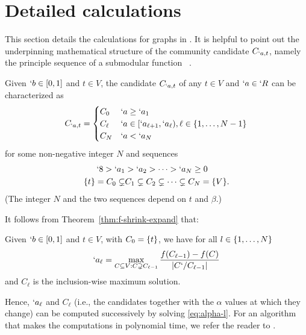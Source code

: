 \section{Detailed calculations}
\label{sec:calculations}
This section details the calculations for graphs in . It is helpful to point out the underpinning mathematical structure of
the community candidate $C_{`a,t}$, namely the principle sequence of a submodular function~\cite{fujishige80} \cite{fujishige-pp-revisited}.

\begin{proposition}
  \label{pro:ps}
  Given $`b\in [0,1]$ and $t\in V$, the candidate $C_{`a,t}$ of any $t\in V$ and $`a\in `R$ can be characterized as
  \begin{align}
    C_{`a,t}  = \begin{cases}
      C_0 & `a\geq `a_1\\
      C_{\ell} & `a\in [`a_{\ell+1},`a_{\ell}), \ell \in \{1,\dots,N-1\}\\
      C_N & `a<`a_N
      \end{cases}
  \end{align}
  for some non-negative integer $N$ and sequences
  \begin{align}
    `8 > `a_1 &> `a_2 > \dots > `a_N \geq 0 \label{eq:`as}\\
    \{t\}=C_0 \subsetneq & C_1  \subsetneq C_2 \subsetneq \dots\subsetneq C_N = \{V\}.\label{eq:Cs}
  \end{align}
  (The integer $N$ and the two sequences depend on $t$ and $\beta$.)
\end{proposition}

It follows from Theorem~\ref{thm:f-shrink-expand} that:
\begin{Corollary}
	\label{cor:alpha-l}
	Given $`b\in [0,1]$ and $t\in V$, with $C_{0} = \{t\}$, we have for all $l\in \{1,\dots, N\}$
  \begin{align}
	 \label{eq:alpha-l}
    `a_{\ell} =  \max_{C\subseteq V: C\supsetneq C_{\ell -1 }}  
				 \frac{f(C_{\ell - 1})- f(C)}{\abs{C`/C_{\ell -1}}} %
  \end{align}
  and $C_{\ell}$ is the inclusion-wise maximum solution.
\end{Corollary}
Hence, $`a_{\ell}$ and $C_{\ell}$ (i.e., the candidates together with the $\alpha$ values at which
they change) can be computed successively by solving \eqref{eq:alpha-l}.
For an algorithm that makes the computations in polynomial time, we refer the reader to
\cite{nagano2011size}.

